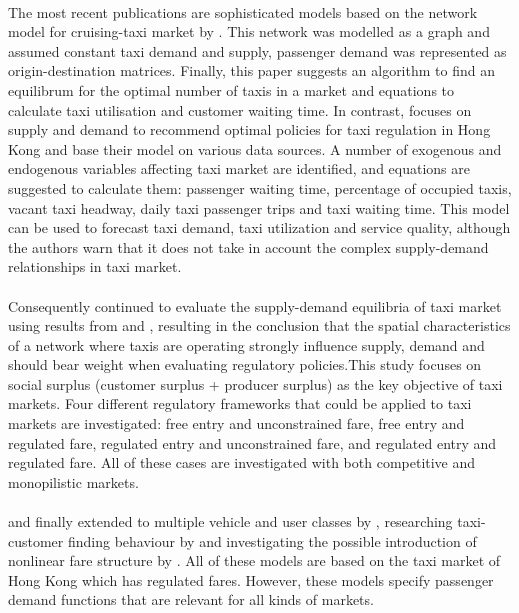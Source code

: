 \paragraph{} The most recent publications are sophisticated models based on the network model for cruising-taxi market by \textcite{Yang1998taxi+network}. This network was modelled as a graph and assumed constant taxi demand and supply, passenger demand was represented as origin-destination matrices. Finally, this paper suggests an algorithm to find an equilibrum for the optimal number of taxis in a market and equations to calculate taxi utilisation and customer waiting time. In contrast, \textcite{Yang2000taxi+utilization} focuses on supply and demand to recommend optimal policies for taxi regulation in Hong Kong and base their model on various data sources. A number of exogenous and endogenous variables affecting taxi market are identified, and equations are suggested to calculate them: passenger waiting time, percentage of occupied taxis, vacant taxi headway, daily taxi passenger trips and taxi waiting time. This model can be used to forecast taxi demand, taxi utilization and service quality, although the authors warn that it does not take in account the complex supply-demand relationships in taxi market.
\paragraph{}Consequently \textcite{Yang2002taxi+demand} continued to evaluate the supply-demand equilibria of taxi market using results from \textcite{Yang1998taxi+network} and \textcite{Yang2000taxi+utilization}, resulting in the conclusion that the spatial characteristics of a network where taxis are operating strongly influence supply, demand and should bear weight when evaluating regulatory policies.This study focuses on social surplus (customer surplus + producer surplus) as the key objective of taxi markets. Four different regulatory frameworks that could be applied to taxi markets are investigated: free entry and unconstrained fare, free entry and regulated fare, regulated entry and unconstrained fare, and regulated entry and regulated fare. All of these cases are investigated with both competitive and monopilistic markets. 
\paragraph{}
and finally extended to multiple vehicle and user classes by \textcite{Wong2008taxi+modeling}, researching taxi-customer finding behaviour by \textcite{Yang2010taxi+equilibria} and investigating the possible introduction of nonlinear fare structure by \textcite{Yang2010taxi+nonlinear}. All of these models are based on the taxi market of Hong Kong which has regulated fares. However, these models specify passenger demand functions that are relevant for all kinds of markets. 


